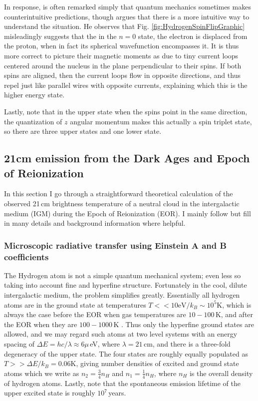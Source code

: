 {In response, is often remarked simply that quantum mechanics sometimes makes counterintuitive predictions, though \citet{griffiths82} argues that there is a more intuitive way to understand the situation. He observes that Fig. \ref{fig:HydrogenSpinFlipGraphic} misleadingly suggests that the in the $n=0$ state, the electron is displaced from the proton, when in fact its spherical wavefunction encompasses it. It is thus more correct to picture their magnetic moments as due to tiny current loops centered around the nucleus in the plane perpendicular to their spins. If both spins are aligned, then the current loops flow in opposite directions, and thus repel just like parallel wires with opposite currents, explaining which this is the higher energy state.

Lastly, note that in the upper state when the spins point in the same direction, the quantization of $z$ angular momentum makes this actually a spin triplet state, so there are three upper states and one lower state.

\subsection{21cm emission from the Dark Ages and Epoch of Reionization}

In this section I go through a straightforward theoretical calculation of the observed 21\,cm brightness temperature of a neutral cloud in the intergalactic medium (IGM) during the Epoch of Reionization (EOR). I mainly follow \citet{PritchardLoebReview} but fill in many details and background information where helpful. 

\subsubsection{Microscopic radiative transfer using Einstein A and B coefficients}

The Hydrogen atom is not a simple quantum mechanical system; even less so taking into account fine and hyperfine structure. Fortunately in the cool, dilute intergalactic medium, the problem simplifies greatly. Essentially all hydrogen atoms are in the ground state at temperatures  $T<<10\text{eV}/k_B\sim10^5$K, which is always the case before the EOR when gas temperatures are $10-100$\,K, and after the EOR when they are $100-1000$\,K \citep{FurlanettoReview}. Thus only the hyperfine ground states are allowed, and we may regard such atoms at two level systems with an energy spacing of $\Delta E=hc/\lambda\approx6\mu$\,eV, where $\lambda=21$\,cm, and there is a three-fold degeneracy of the upper state. The four states are roughly equally populated as $T>>\Delta E/k_B =0.06$K, giving number densities of excited and ground state atoms which we write as $n_2=\frac{3}{4}n_H$ and $n_1=\frac{1}{4}n_H$, where $n_H$ is the overall density of hydrogen atoms. Lastly, note that the spontaneous emission lifetime of the upper excited state is roughly $10^7$\,years.

}
